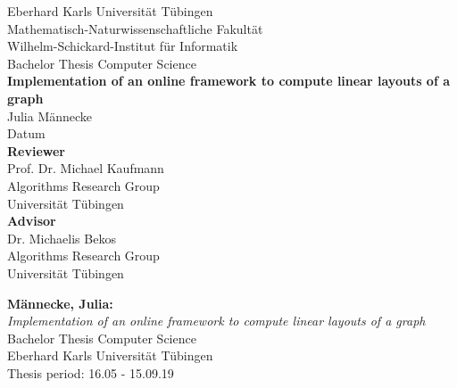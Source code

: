 \documentclass[twoside,12pt,a4paper]{report}
\begin{document}
 
\begin{titlepage}
 \begin{center}
  {\LARGE Eberhard Karls Universit\"at T\"ubingen}\\
  {\large Mathematisch-Naturwissenschaftliche Fakult\"at \\
Wilhelm-Schickard-Institut f\"ur Informatik\\[4cm]}
  {\huge Bachelor Thesis Computer Science\\[2cm]}
  {\Large\bf  Implementation of an online framework to
compute linear layouts of a graph\\[1.5cm]}
 {\large Julia M\"annecke}\\[0.5cm]
Datum\\[3cm]
{\small\bf Reviewer}\\[0.3cm]
{\large Prof. Dr. Michael Kaufmann}\\
  {\footnotesize Algorithms Research Group\\
	Universität Tübingen}\\[0.5cm]	
	

{\small\bf Advisor}\\[0.3cm]
{\large Dr. Michaelis Bekos}\\
  {\footnotesize Algorithms Research Group\\
	Universität Tübingen}\end{center}
	
  
\end{titlepage}


\thispagestyle{empty}
\vspace*{\fill}
\begin{minipage}{11.2cm}
\textbf{M\"annecke, Julia:}\\
\emph{Implementation of an online framework to
compute linear layouts of a graph}\\ Bachelor Thesis Computer Science\\
Eberhard Karls Universit\"at T\"ubingen\\
Thesis period: 16.05 - 15.09.19
\end{minipage}
\newpage
\end{document}
